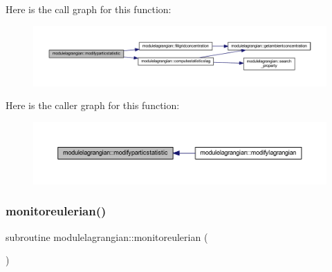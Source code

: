 Here is the call graph for this function\+:\nopagebreak
\begin{figure}[H]
\begin{center}
\leavevmode
\includegraphics[width=350pt]{namespacemodulelagrangian_a101763d65fb26cd32c402a807ae7c733_cgraph}
\end{center}
\end{figure}
Here is the caller graph for this function\+:\nopagebreak
\begin{figure}[H]
\begin{center}
\leavevmode
\includegraphics[width=350pt]{namespacemodulelagrangian_a101763d65fb26cd32c402a807ae7c733_icgraph}
\end{center}
\end{figure}
\mbox{\label{namespacemodulelagrangian_ad6a4bcc42c67f187fb3a812f39b8c751}} 
\subsubsection{\texorpdfstring{monitoreulerian()}{monitoreulerian()}}
{\footnotesize\ttfamily subroutine modulelagrangian\+::monitoreulerian (\begin{DoxyParamCaption}{ }\end{DoxyParamCaption})\hspace{0.3cm}{\ttfamily [private]}}


